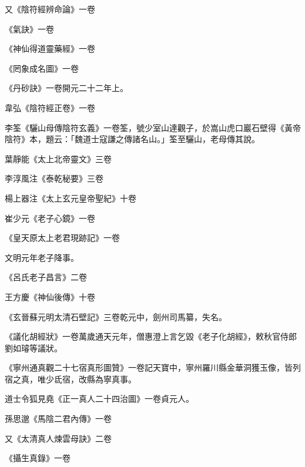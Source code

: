 \begin{pinyinscope}
 又《陰符經辨命論》一卷



 《氣訣》一卷



 《神仙得道靈藥經》一卷



 《罔象成名圖》一卷



 《丹砂訣》一卷開元二十二年上。



 韋弘《陰符經正卷》一卷



 李筌《驪山母傳陰符玄義》一卷筌，號少室山達觀子，於嵩山虎口巖石壁得《黃帝陰符》本，題云：「魏道士寇謙之傳諸名山。」筌至驪山，老母傳其說。



 葉靜能《太上北帝靈文》三卷



 李淳風注《泰乾秘要》三卷



 楊上器注《太上玄元皇帝聖紀》十卷



 崔少元《老子心鏡》一卷



 《皇天原太上老君現跡記》一卷



 文明元年老子降事。



 《呂氏老子昌言》二卷



 王方慶《神仙後傳》十卷



 《玄晉蘇元明太清石壁記》三卷乾元中，劍州司馬纂，失名。



 《議化胡經狀》一卷萬歲通天元年，僧惠澄上言乞毀《老子化胡經》，敕秋官侍郎劉如璿等議狀。



 《寧州通真觀二十七宿真形圖贊》一卷記天寶中，寧州羅川縣金華洞獲玉像，皆列宿之真，唯少氐宿，改縣為寧真事。



 道士令狐見堯《正一真人二十四治圖》一卷貞元人。



 孫思邈《馬陰二君內傳》一卷



 又《太清真人煉雲母訣》二卷



 《攝生真錄》一卷




\end{pinyinscope}
